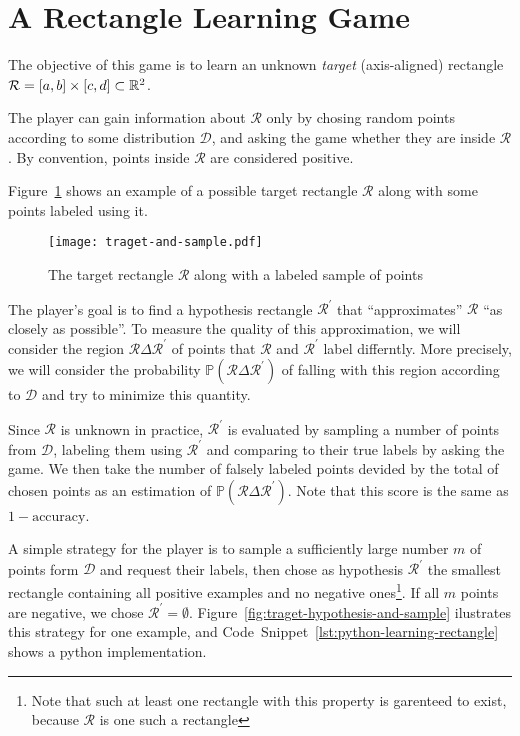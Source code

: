 \section{A Rectangle Learning Game}
\newcommand{\rectangle}{\mathcal{R}}
The objective of this game is to learn an unknown \emph{target} (axis-aligned) rectangle \(\rectangle = [a, b] \times [c, d] \subset \reals^2\).

The player can gain information about \(\rectangle\) only by chosing random points according to some distribution \(\mathcal{D}\), and asking the game whether they are inside \(\rectangle\). By convention, points inside \(\rectangle\) are considered positive.

Figure~\ref{fig:traget-and-sample} shows an example of a possible target rectangle \(\rectangle\) along with some points labeled using it.

\begin{figure}
    \begin{center}
        \texttt{[image: traget-and-sample.pdf]}  
    \end{center}
    \caption{The target rectangle \(\rectangle\) along with a labeled sample of points}
    \label{fig:traget-and-sample}
\end{figure}

The player's goal is to find a hypothesis rectangle \(\rectangle^\prime\) that ``approximates'' \(\rectangle\) ``as closely as possible''. To measure the quality of this approximation, we will consider the region \(\rectangle\Delta\rectangle^\prime\) of points that \(\rectangle\) and \(\rectangle^\prime\) label differntly. More precisely, we will consider the probability \(\mathbb{P}(\rectangle\Delta\rectangle^\prime)\) of falling with this region according to \(\mathcal{D}\) and try to minimize this quantity.

Since \(\rectangle\) is unknown in practice, \(\rectangle^\prime\) is evaluated by sampling a number of points from \(\mathcal{D}\), labeling them using \(\rectangle^\prime\) and comparing to their true labels by asking the game. We then take the number of falsely labeled points devided by the total of chosen points as an estimation of \(\mathbb{P}(\rectangle\Delta\rectangle^\prime)\).
Note that this score is the same as \(1 - \mathrm{accuracy}\).

A simple strategy for the player is to sample a sufficiently large number \(m\) of points form \(\mathcal{D}\) and request their labels, then chose as hypothesis \(\rectangle^\prime\) the smallest rectangle containing all positive examples and no negative ones\footnote{Note that such at least one rectangle with this property is garenteed to exist, because \(\rectangle\) is one such a rectangle}. If all \(m\) points are negative, we chose \(\rectangle^\prime = \emptyset\). Figure~\ref{fig:traget-hypothesis-and-sample} ilustrates this strategy for one example, and Code~Snippet~\ref{lst:python-learning-rectangle} shows a python implementation.


